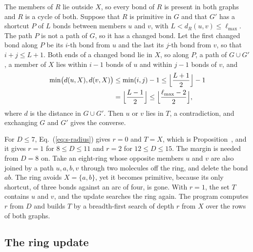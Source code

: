\documentclass[preprint,12pt]{elsarticle}
\begin{document}
\begin{pf}
The members of $R$ lie outside $X$, so every bond of $R$ is present in
both graphs and $R$ is a cycle of both.
Suppose that $R$ is primitive in $G$ and that $G'$ has a shortcut $P$ of
$L$ bonds between members $u$ and $v$, with $L<d_R(u,v)\le\ell_{\max}$.
The path $P$ is not a path of $G$, so it has a changed bond.
Let the first changed bond along $P$ be its $i$-th bond from $u$ and the
last its $j$-th bond from $v$, so that $i+j\le L+1$.
Both ends of a changed bond lie in $X$, so along $P$, a path of
$G\cup G'$, a member of $X$ lies within $i-1$ bonds of $u$ and within
$j-1$ bonds of $v$, and
\begin{equation*}
  \begin{aligned}
    \min\bigl(d(u,X),d(v,X)\bigr)&\le\min(i,j)-1\le\Bigl\lfloor\frac{L+1}{2}\Bigr\rfloor-1\\
    &=\Bigl\lfloor\frac{L-1}{2}\Bigr\rfloor\le\Bigl\lfloor\frac{\ell_{\max}-2}{2}\Bigr\rfloor,
  \end{aligned}
\end{equation*}
where $d$ is the distance in $G\cup G'$.
Then $u$ or $v$ lies in $T$, a contradiction, and exchanging $G$ and
$G'$ gives the converse.
\end{pf}

For $D\le 7$, Eq.~(\ref{eq:s-radius}) gives $r=0$ and $T=X$, which is
Proposition~, and it gives $r=1$ for $8\le D\le 11$ and
$r=2$ for $12\le D\le 15$.
The margin is needed from $D=8$ on.
Take an eight-ring whose opposite members $u$ and $v$ are also joined by
a path $u,a,b,v$ through two molecules off the ring, and delete the bond
$ab$.
The ring avoids $X=\{a,b\}$, yet it becomes primitive, because its only
shortcut, of three bonds against an arc of four, is gone.
With $r=1$, the set $T$ contains $u$ and $v$, and the update searches
the ring again.
The program computes $r$ from $D$ and builds $T$ by a breadth-first
search of depth $r$ from $X$ over the rows of both graphs.

\subsection{The ring update}
\label{sec:s-update}
\end{document}
